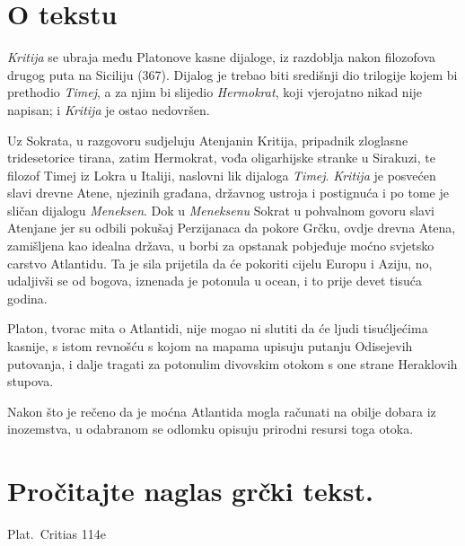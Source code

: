 


\section*{O tekstu}

\textit{Kritija} se ubraja među Platonove kasne dijaloge, iz razdoblja nakon filozofova drugog puta na Siciliju (367). Dijalog je trebao biti središnji dio trilogije kojem bi prethodio \textit{Timej}, a za njim bi slijedio \textit{Hermokrat}, koji vjerojatno nikad nije napisan; i \textit{Kritija} je ostao nedovršen. 

Uz Sokrata, u razgovoru sudjeluju Atenjanin Kritija, pripadnik zloglasne tridesetorice tirana, zatim Hermokrat, vođa oligarhijske stranke u Sirakuzi, te filozof Timej iz Lokra u Italiji, naslovni lik dijaloga \textit{Timej}.  \textit{Kritija} je posvećen slavi drevne Atene, njezinih građana, državnog ustroja i postignuća i po tome je sličan dijalogu \textit{Meneksen}. Dok u \textit{Meneksenu} Sokrat u pohvalnom govoru slavi Atenjane jer su odbili pokušaj Perzijanaca da pokore Grčku, ovdje drevna Atena, zamišljena kao idealna država, u borbi za opstanak pobjeđuje moćno svjetsko carstvo Atlantidu. Ta je sila prijetila da će pokoriti cijelu Europu i Aziju, no, udaljivši se od bogova, iznenada je potonula u ocean, i to prije devet tisuća godina. 

Platon, tvorac mita o Atlantidi, nije mogao ni slutiti da će ljudi tisućljećima kasnije, s istom revnošću s kojom na mapama upisuju putanju Odisejevih putovanja, i dalje tragati za potonulim divovskim otokom s one strane Heraklovih stupova. 

Nakon što je rečeno da je moćna Atlantida mogla računati na obilje dobara iz inozemstva, u odabranom se odlomku opisuju prirodni resursi toga otoka.

\newpage

\section*{Pročitajte naglas grčki tekst.}


Plat.\ Critias 114e

\medskip


